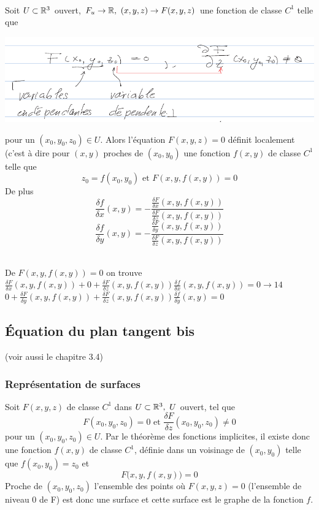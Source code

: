 \documentclass[12pt,a4paper]{article}
\begin{document}
\begin{boite}
	\\
	Soit $U \subset \mathbb{R}^3$ ouvert, $F_u \to \mathbb{R},\ (x,y,z) \to F(x,y,z)$ une fonction de classe $C^1$ telle que 
	\begin{center}
		\includegraphics[scale=0.5]{images/version_r3}
	\end{center}
	pour un $(x_0,y_0,z_0) \in U$. Alors l'équation $F(x,y,z) = 0$ définit localement (c'est à dire pour $(x,y)$ proches de $(x_0,y_0)$ une fonction $f(x,y)$ de classe $C^1$ telle que 
	\begin{equation*}
		z_0 = f(x_0,y_0) \text{ et } F(x,y,f(x,y)) = 0
	\end{equation*}
	De plus
	\begin{equation}
		\frac{\delta f}{\delta x} (x,y) = - \frac{\frac{\delta F}{\delta x}(x,y,f(x,y))}{\frac{\delta F}{\delta z}(x,y,f(x,y))}
	\end{equation}
	\begin{equation}
		\frac{\delta f}{\delta y} (x,y) = - \frac{\frac{\delta F}{\delta y}(x,y,f(x,y))}{\frac{\delta F}{\delta z}(x,y,f(x,y))}
	\end{equation}
\end{boite}
\\
De $F(x,y,f(x,y)) = 0$ on trouve\\
$\frac{\delta F}{\delta x}(x,y,f(x,y)) + 0 + \frac{\delta F}{\delta z}(x,y,f(x,y))\frac{\delta f}{\delta x}(x,y,f(x,y)) = 0 \to 14$\\
$0 + \frac{\delta F}{\delta y}(x,y,f(x,y)) + \frac{\delta F}{\delta z}(x,y,f(x,y))\frac{\delta f}{\delta y}(x,y) = 0$

\subsection{Équation du plan tangent bis}
(voir aussi le chapitre 3.4)
\subsubsection{Représentation de surfaces}
Soit $F(x,y,z)$ de classe $C^1$ dans $U\subset \mathbb{R}^3,\ U$ ouvert, tel que 
\begin{equation*}
	F(x_0,y_0,z_0) =0 \text{ et }\frac{\delta F}{\delta z}(x_0,y_0,z_0) \neq 0
\end{equation*}
pour un $(x_0,y_0,z_0) \in U$. Par le théorème des fonctions implicites, il existe donc une fonction $f(x,y)$ de classe $C^1$, définie dans un voisinage de $(x_0,y_0)$ telle que $f(x_0,y_0) = z_0$ et 
\begin{equation*}
	F\big(x,y,f(x,y)\big) = 0
\end{equation*}
Proche de $(x_0,y_0,z_0)$ l'ensemble des points où $F(x,y,z) = 0$ (l'ensemble de niveau 0 de F) est donc une surface et cette surface est le graphe de la fonction $f$.
\end{document}
